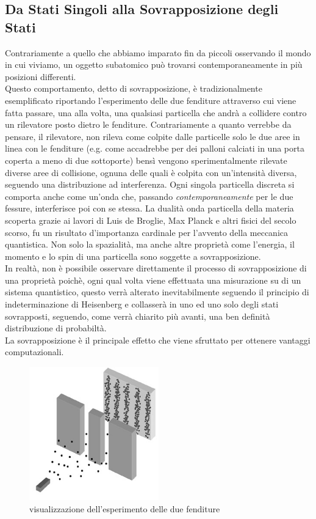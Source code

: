 \documentclass[12pt,a4paper,openright]{report}
\begin{document}
\subsection{Da Stati Singoli alla Sovrapposizione degli Stati}
  Contrariamente a quello che abbiamo imparato fin da piccoli osservando il mondo in cui viviamo, un oggetto subatomico può trovarsi contemporaneamente in più posizioni differenti.\\
  Questo comportamento, detto di sovrapposizione, è tradizionalmente esemplificato riportando l'esperimento \cite{ref13} delle due fenditure attraverso cui viene 
  fatta passare, una alla volta, una qualsiasi particella che andrà a collidere contro un rilevatore posto dietro le fenditure. Contrariamente a quanto verrebbe da pensare,
  il rilevatore, non rileva come colpite dalle particelle solo le due aree in linea con le fenditure (e.g. come accadrebbe per dei palloni calciati in una porta coperta a meno di due sottoporte) bensì vengono 
  sperimentalmente rilevate diverse aree di collisione, ognuna delle quali è colpita con un'intensità diversa, seguendo una distribuzione ad interferenza.
  Ogni singola particella discreta si comporta anche come un'onda che, passando \emph{contemporaneamente} per le due fessure, interferisce poi con se stessa.
  La dualità onda particella della materia scoperta grazie ai lavori di Luis de Broglie, Max Planck e altri fisici del secolo scorso, fu un risultato d'importanza cardinale per l'avvento della meccanica quantistica.
  Non solo la spazialità, ma anche altre proprietà come l'energia, il momento e lo spin di una particella sono soggette a sovrapposizione.\\
  In realtà, non è possibile osservare direttamente il processo di sovrapposizione di una proprietà poichè, ogni qual volta viene effettuata una misurazione su di un
  sistema quantistico, questo verrà alterato inevitabilmente seguendo il principio di indeterminazione di Heisenberg e collasserà in uno ed uno solo degli stati sovrapposti, seguendo, come verrà chiarito più avanti, una ben definità distribuzione di probabiltà.\\
  La sovrapposizione è il principale effetto che viene sfruttato per ottenere vantaggi computazionali. 
\begin{figure}[h]
    \centering
    \includegraphics[width=0.5\textwidth]{double-slit-electrons1}
    \caption{visualizzazione dell'esperimento delle due fenditure}
\end{figure}
  
\end{document}
